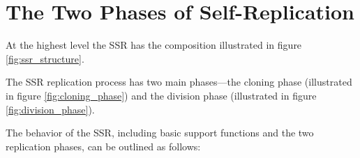 \section{The Two Phases of Self-Replication}

At the highest level the SSR has the composition 
illustrated in figure \ref{fig:ssr_structure}.


The SSR replication process has two main phases---the cloning phase (illustrated in figure \ref{fig:cloning_phase}) and the division phase (illustrated in figure \ref{fig:division_phase}).



The behavior of the SSR, including basic support functions and the two replication phases, can be outlined as follows:

